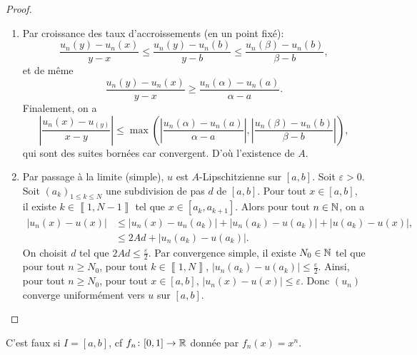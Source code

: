 \documentclass[12pt]{article}
\begin{document}
\begin{proof}
    \phantom{}
    \begin{enumerate}
        \item Par croissance des taux d'accroissements (en un point fixé):
        \begin{equation}
            \frac{u_n(y)-u_n(x)}{y-x}\leqslant\frac{u_n(y)-u_n(b)}{y-b}\leqslant\frac{u_n(\beta)-u_n(b)}{\beta-b},
        \end{equation}
        et de même
        \begin{equation}
            \frac{u_n(y)-u_n(x)}{y-x}\geqslant\frac{u_n(\alpha)-u_n(a)}{\alpha-a}.
        \end{equation}
        Finalement, on a 
        \begin{equation}
            \left\lvert\frac{u_n(x)-u_(y)}{x-y}\right\rvert\leqslant\max\left(\left\lvert\frac{u_n(\alpha)-u_n(a)}{\alpha-a}\right\rvert,\left\lvert\frac{u_n(\beta)-u_n(b)}{\beta-b}\right\rvert\right),
        \end{equation}
        qui sont des suites bornées car convergent. D'où l'existence de $A$.

        \item Par passage à la limite (simple), $u$ est $A$-Lipschitzienne sur $[a,b]$. Soit $\varepsilon>0$. Soit $(a_{k})_{1\leqslant k\leqslant N}$ une subdivision de pas $d$ de $[a,b]$. Pour tout $x\in[a,b]$, il existe $k\in\left\llbracket1,N-1\right\rrbracket$ tel que $x\in[a_{k},a_{k+1}]$.
        Alors pour tout $n\in\mathbb{N}$, on a 
        \begin{align}
            \left\lvert u_n(x)-u(x)\right\rvert
            &\leqslant\left\lvert u_n(x)-u_n(a_k)\right\rvert+\left\lvert u_n(a_k)-u(a_k)\right\rvert+\left\lvert u(a_k)-u(x)\right\rvert,\\
            &\leqslant2Ad+\left\lvert u_n(a_k)-u(a_k)\right\rvert.
        \end{align}
        On choisit $d$ tel que $2Ad\leqslant\frac{\varepsilon}{2}$. Par convergence simple, il existe $N_{0}\in\mathbb{N}$ tel que pour tout $n\geqslant N_{0}$, pour tout $k\in\left\llbracket1,N\right\rrbracket$, $\left\lvert u_n(a_k)-u(a_k)\right\rvert\leqslant\frac{\varepsilon}{2}$. Ainsi, pour tout $n\geqslant N_{0}$, pour tout $x\in[a,b]$, $\left\lvert u_n(x)-u(x)\right\rvert\leqslant\varepsilon$. Donc $(u_n)$ converge uniformément vers $u$ sur $[a,b]$.
    \end{enumerate}
\end{proof}

\begin{remark}
    C'est faux si $I=[a,b]$, cf $f_n\colon[0,1]\to\mathbb{R}$ donnée par $f_n(x)=x^{n}$.
\end{remark}
\end{document}
